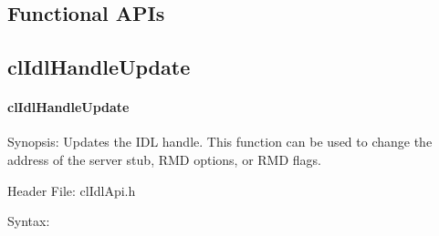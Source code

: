 \begin{flushleft}
\newpage

\section{Functional APIs}
\subsection{clIdlHandleUpdate}
\hypertarget{pageidl202}{}\paragraph{cl\-Idl\-Handle\-Update}\label{pageidl202}
\begin{Desc}
\item[Synopsis:]Updates the IDL handle. This function can be used to change the address of the server stub, RMD options, or RMD flags.\end{Desc}
\begin{Desc}
\item[Header File:]clIdlApi.h\end{Desc}
\begin{Desc}
\item[Syntax:]


\end{Desc}
\end{flushleft}
